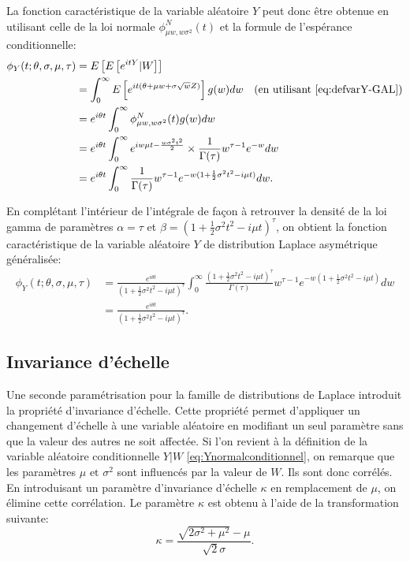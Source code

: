 La fonction caractéristique de la variable aléatoire $Y$ peut donc
être obtenue en utilisant celle de la loi normale $\phi^{N}_{\mu
  w,w\sigma^2}(t)$ et la formule de l'espérance conditionnelle:
\begin{align*}
  \phi_Y(t;\theta,\sigma,\mu,\tau) &= E\left[E\left[e^{itY} | W \right] \right]  \\
  &= \int_0^{\infty} E \left[ e^{it(\theta + \mu w+\sigma\sqrt{w}Z)} \right] g(w) dw  \quad \mbox{(en utilisant \eqref{eq:defvarY-GAL})} \\
  &= e^{i\theta t}\int_0^{\infty} \phi^{N}_{\mu w,w\sigma^2}(t)g(w)dw \\
  &= e^{i\theta t}\int_0^{\infty} e^{ iw\mu t-\frac{w\sigma^2t^2}{2}} \times \frac{1}{\Gamma (\tau)} w^{\tau-1}e^{-w} dw \\
  &= e^{i\theta t}\int_0^{\infty} \frac{1}{\Gamma (\tau)} w^{\tau-1} e^{-w(1+\frac{1}{2} \sigma^2 t^2 - i\mu t)} dw.
\end{align*}

En complétant l'intérieur de l'intégrale de façon à retrouver la
densité de la loi gamma de paramètres $\alpha=\tau$ et
$\beta=\left(1+\frac{1}{2} \sigma^2 t^2 - i\mu t \right)^{\tau}$, on
obtient la fonction caractéristique de la variable aléatoire $Y$ de
distribution Laplace asymétrique généralisée:
\begin{align}
  \label{eq:fncaractGALmu}
  \phi_Y(t;\theta,\sigma,\mu,\tau) &= \frac{e^{i\theta t}}{{\left(1+\frac{1}{2} \sigma^2 t^2 - i\mu t \right)^{\tau}}}\int_0^{\infty} \frac{\left(1+\frac{1}{2} \sigma^2 t^2 - i\mu t \right)^{\tau}}{\Gamma (\tau)} w^{\tau-1} e^{-w(1+\frac{1}{2} \sigma^2 t^2 - i\mu t)} dw \nonumber\\
  &= \frac{e^{i\theta t}}{\left(1+\frac{1}{2} \sigma^2 t^2 - i\mu t
    \right)^{\tau}}.
\end{align}

\subsection{Invariance d'échelle}
\label{sec:invariance-dechelle}

Une seconde paramétrisation pour la famille de distributions de
Laplace introduit la propriété d'invariance d'échelle. Cette propriété
permet d'appliquer un changement d'échelle à une variable aléatoire en
modifiant un seul paramètre sans que la valeur des autres ne soit
affectée. Si l'on revient à la définition de la variable aléatoire
conditionnelle $Y|W$ \eqref{eq:Ynormalconditionnel}, on remarque que
les paramètres $\mu \text{ et } \sigma^2$ sont influencés par la valeur
de $W$. Ils sont donc corrélés. En introduisant un paramètre
d'invariance d'échelle $\kappa$ en remplacement de $\mu$, on élimine
cette corrélation. Le paramètre $\kappa$ est obtenu à l'aide de la
transformation suivante:
\begin{equation}
  \label{eq:mukappa}
  \kappa = \frac{\sqrt{2\sigma^2+\mu^2}-\mu}{\sqrt{2}\sigma}.
\end{equation}

